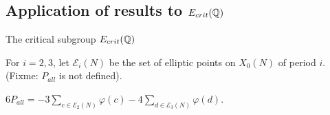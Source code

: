 \documentclass[handout]{beamer}
\begin{document}
\subsection{Application of results to $E_{crit}(\mathbb{Q})$}

\begin{frame}{The critical subgroup $E_{crit}(\mathbb{Q})$}





For $i = 2,3$, let $\mathscr{E}_i(N)$ be the set of elliptic points on $X_0(N)$ of period $i$. \\

(Fixme: $P_{all}$ is not defined). 

\pause
\begin{Lemma}[C.]
$6 P_{all} =  - 3 \sum_{c \in \mathscr{E}_2(N)} \varphi(c) - 4 \sum_{d \in \mathscr{E}_3(N)} \varphi(d)$. \\
\end{Lemma}


\end{frame}
\end{document}
